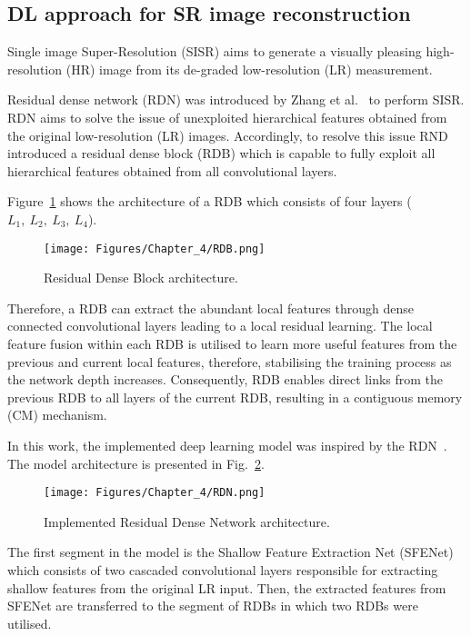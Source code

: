 \subsection{DL approach for SR image reconstruction}
\label{sec63}
Single image Super-Resolution (SISR) aims to generate a visually pleasing high-resolution (HR) image from its de-graded low-resolution (LR) measurement.

Residual dense network (RDN) was introduced by Zhang et al.~\cite{Zhang2018} to perform SISR.
RDN aims to solve the issue of unexploited hierarchical features obtained from the original low-resolution (LR) images.
Accordingly, to resolve this issue RND introduced a residual dense block (RDB) which is capable to fully exploit all hierarchical features obtained from all convolutional layers.

Figure~\ref{fig:RDB} shows the architecture of a RDB which consists of four  layers (\(L_1,\ L_2,\ L_3,\ L_4\)).
\begin{figure} [h!]
	\begin{center}
		\texttt{[image: Figures/Chapter\_4/RDB.png]}
	\end{center}
	\caption{Residual Dense Block architecture.} 
	\label{fig:RDB}
\end{figure}
Therefore, a RDB can extract the abundant local features through dense connected convolutional layers leading to a local residual learning.
The local feature fusion within each RDB is utilised to learn more useful features from the previous and current local features, therefore, stabilising the training process as the network depth increases.
Consequently, RDB enables direct links from the previous RDB to all layers of the current RDB, resulting in a contiguous memory (CM) mechanism.

In this work, the implemented deep learning model was inspired by the RDN~\cite{Zhang2018}. 
The model architecture is presented in Fig.~\ref{fig:RDN}.
\begin{figure} [h!]
	\begin{center}
		\texttt{[image: Figures/Chapter\_4/RDN.png]}
	\end{center}
	\caption{Implemented Residual Dense Network architecture.} 
	\label{fig:RDN}
\end{figure}
The first segment in the model is the Shallow Feature Extraction Net (SFENet) which consists of two cascaded convolutional layers responsible for extracting shallow features from the original LR input.
Then, the extracted features from SFENet are transferred to the segment of RDBs in which two RDBs were utilised.

